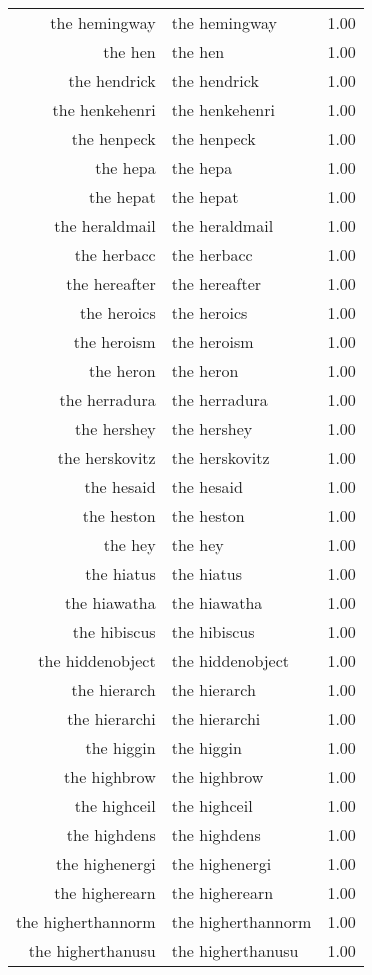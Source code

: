 \begin{table}[ht]
\begin{tabular}{rlr}
  the hemingway & the hemingway & 1.00 \\ 
  the hen & the hen & 1.00 \\ 
  the hendrick & the hendrick & 1.00 \\ 
  the henkehenri & the henkehenri & 1.00 \\ 
  the henpeck & the henpeck & 1.00 \\ 
  the hepa & the hepa & 1.00 \\ 
  the hepat & the hepat & 1.00 \\ 
  the heraldmail & the heraldmail & 1.00 \\ 
  the herbacc & the herbacc & 1.00 \\ 
  the hereafter & the hereafter & 1.00 \\ 
  the heroics & the heroics & 1.00 \\ 
  the heroism & the heroism & 1.00 \\ 
  the heron & the heron & 1.00 \\ 
  the herradura & the herradura & 1.00 \\ 
  the hershey & the hershey & 1.00 \\ 
  the herskovitz & the herskovitz & 1.00 \\ 
  the hesaid & the hesaid & 1.00 \\ 
  the heston & the heston & 1.00 \\ 
  the hey & the hey & 1.00 \\ 
  the hiatus & the hiatus & 1.00 \\ 
  the hiawatha & the hiawatha & 1.00 \\ 
  the hibiscus & the hibiscus & 1.00 \\ 
  the hiddenobject & the hiddenobject & 1.00 \\ 
  the hierarch & the hierarch & 1.00 \\ 
  the hierarchi & the hierarchi & 1.00 \\ 
  the higgin & the higgin & 1.00 \\ 
  the highbrow & the highbrow & 1.00 \\ 
  the highceil & the highceil & 1.00 \\ 
  the highdens & the highdens & 1.00 \\ 
  the highenergi & the highenergi & 1.00 \\ 
  the higherearn & the higherearn & 1.00 \\ 
  the higherthannorm & the higherthannorm & 1.00 \\ 
  the higherthanusu & the higherthanusu & 1.00 \\ 

\end{tabular}
\end{table}
